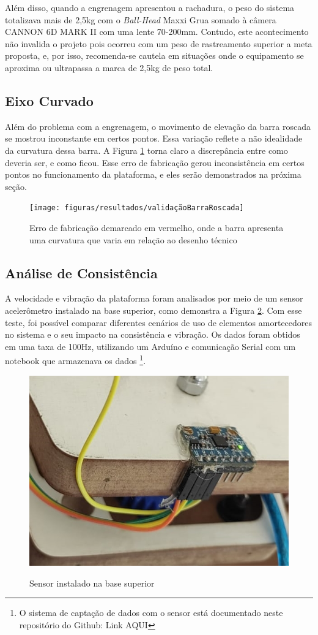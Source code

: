 Além disso, quando a engrenagem apresentou a rachadura, o peso do sistema totalizava mais de 2,5kg com o \textit{Ball-Head }Maxxi Grua somado à câmera CANNON 6D MARK II com uma lente 70-200mm. Contudo, este acontecimento não invalida o projeto pois ocorreu com um peso de rastreamento superior a meta proposta, e, por isso, recomenda-se cautela em situações onde o equipamento se aproxima ou ultrapassa a marca de 2,5kg de peso total.
 

\subsection{Eixo Curvado}
Além do problema com a engrenagem, o movimento de elevação da barra roscada se mostrou inconstante em certos pontos. Essa variação reflete a não idealidade da curvatura dessa barra. A Figura \ref{fig:validaçãoBarraRoscada} torna claro a discrepância entre como deveria ser, e como ficou. Esse erro de fabricação gerou inconsistência em certos pontos no funcionamento da plataforma, e eles serão demonstrados na próxima seção.

\begin{figure}[htb]
	\centering
	\caption{Erro de fabricação demarcado em vermelho, onde a barra apresenta uma curvatura que varia em relação ao desenho técnico}
	\texttt{[image: figuras/resultados/validaçãoBarraRoscada]}
	\label{fig:validaçãoBarraRoscada}
\end{figure}


\subsection{Análise de Consistência}
\label{sec:vibracao}

A velocidade e vibração da plataforma foram analisados por meio de um sensor acelerômetro instalado na base superior, como demonstra a Figura \ref{fig:sensorInstaladoPlataforma}. Com esse teste, foi possível comparar diferentes cenários de uso de elementos amortecedores no sistema e o seu impacto na consistência e vibração. Os dados foram obtidos em uma taxa de 100Hz, utilizando um Arduíno e comunicação Serial com um notebook que armazenava os dados \footnote{O sistema de captação de dados com o sensor está documentado neste repositório do Github: Link AQUI}. 

\begin{figure}[htb]
	\centering
	\caption{Sensor instalado na base superior}
	\includegraphics[width=0.35\linewidth]{figuras/resultados/sensorInstaladoPlataforma}
	\label{fig:sensorInstaladoPlataforma}
\end{figure}

